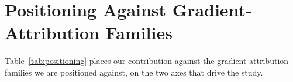 
\section{Positioning Against Gradient-Attribution Families}
\label{app:positioning}

Table~\ref{tab:positioning} places our contribution against the gradient-attribution families we are positioned against, on the two axes that drive the study.

